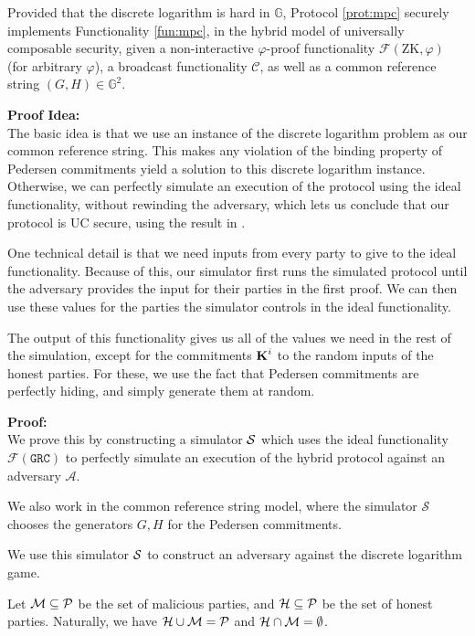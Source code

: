 \begin{claim}
Provided that the discrete logarithm is hard in $\mathbb{G}$, Protocol \ref{prot:mpc} securely implements Functionality \ref{fun:mpc},
in the hybrid model of universally composable security,
given a non-interactive $\varphi$-proof functionality $\mathcal{F}(\text{ZK}, \varphi)$ (for arbitrary $\varphi$),
a broadcast functionality $\mathcal{C}$, as well as a common reference string
${(G, H) \in \mathbb{G}^2}$.
\end{claim}
\textbf{Proof Idea:}\\
The basic idea is that we use an instance of the discrete logarithm problem
as our common reference string.
This makes any violation of the binding property of Pedersen commitments
yield a solution to this discrete logarithm instance.
Otherwise, we can perfectly simulate an execution of the protocol
using the ideal functionality, without rewinding
the adversary, which lets us conclude that our protocol is UC secure,
using the result in \cite{kushilevitz_information-theoretically_2009}.

One technical detail is that we need inputs from every party
to give to the ideal functionality.
Because of this, our simulator first runs the simulated protocol
until the adversary provides the input for their parties in the first proof.
We can then use these values for the parties the simulator controls
in the ideal functionality.

The output of this functionality gives us all of the values we need
in the rest of the simulation, except for the commitments $\textbf{K}^i$
to the random inputs of the honest parties.
For these, we use the fact that Pedersen commitments are perfectly
hiding, and simply generate them at random.

\textbf{Proof:}\\
We prove this by constructing a simulator $\mathcal{S}$ which uses
the ideal functionality $\mathcal{F}(\texttt{GRC})$ to perfectly
simulate an execution of the hybrid protocol against an adversary
$\mathcal{A}$.

We also work in the common reference string model, where the simulator
$\mathcal{S}$ chooses the generators $G, H$ for the Pedersen commitments.

We use this simulator $\mathcal{S}$ to construct an adversary against
the discrete logarithm game.

Let $\mathcal{M} \subseteq \mathcal{P}$ be the set of malicious parties,
and $\mathcal{H} \subseteq \mathcal{P}$ be the set of honest parties. Naturally,
we have $\mathcal{H} \cup \mathcal{M} = \mathcal{P}$ and $\mathcal{H} \cap \mathcal{M} = \emptyset$.

